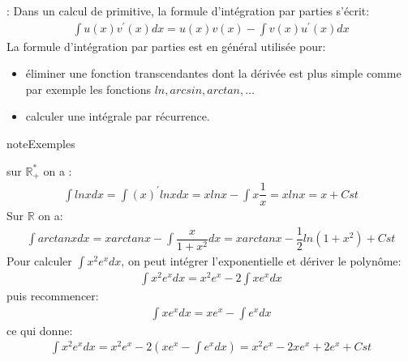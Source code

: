 \documentclass[letterpaper,10pt,french]{sphinxmanual}
\begin{document}
\sphinxAtStartPar
{}: Dans un calcul de primitive, la formule d’intégration par parties s’écrit:
\begin{equation*}
\begin{split}
\int u(x)v^{'}(x)dx = u(x)v(x) - \int v(x)u^{'}(x)dx
\end{split}
\end{equation*}
\sphinxAtStartPar
La formule d’intégration par parties est en général utilisée pour:
\begin{itemize}
\item {} 
\sphinxAtStartPar
éliminer une fonction transcendantes dont la dérivée est plus simple comme par exemple les fonctions \(ln, arcsin, arctan,\ldots\)

\item {} 
\sphinxAtStartPar
calculer une intégrale par récurrence.

\end{itemize}

\begin{sphinxadmonition}{note}{Exemples}

\sphinxhyphen{} sur \(\mathbb R_+^*\) on a :
\begin{equation*}
\begin{split}
\int ln x dx = \int (x)^{'}ln x dx = xln x - \int x\dfrac{1}{x} = xln x = x + Cst 
\end{split}
\end{equation*}
\sphinxhyphen{} Sur \(\mathbb R\) on a:
\begin{equation*}
\begin{split}
\int arctan x dx = x arctan x - \int \dfrac{x}{1+x^2} dx = x arctan x - \dfrac{1}{2}ln (1+x^2) + Cst
\end{split}
\end{equation*}
 \sphinxhyphen{} Pour calculer \(\int x^2 e^x dx\), on peut intégrer l’exponentielle et dériver le polynôme:
\begin{equation*}
\begin{split}
\int x^2 e^x dx = x^2e^x - 2\int xe^x dx
\end{split}
\end{equation*}
\sphinxAtStartPar
puis recommencer:
\begin{equation*}
\begin{split}
\int xe^x dx = xe^x - \int e^x dx
\end{split}
\end{equation*}
\sphinxAtStartPar
ce qui donne:
\begin{equation*}
\begin{split}
\int x^2 e^x dx = x^2e^x - 2(xe^x - \int e^x dx) = x^2e^x - 2xe^x + 2e^x + Cst
\end{split}
\end{equation*}\end{sphinxadmonition}
\end{document}

